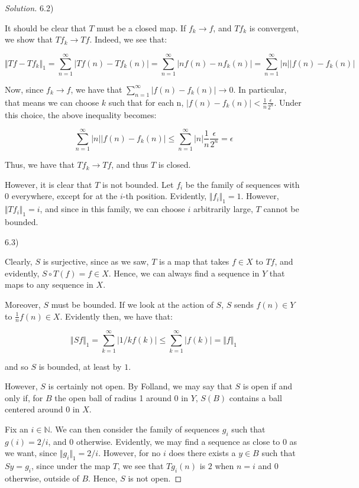 \documentclass[10pt]{article}
\begin{document}
\begin{proof}[Solution]
6.2)

It should be clear that $T$ must be a closed map. If $f_k \to f$, and $T f_k$ is convergent, we show that $Tf_k \to Tf$. Indeed, we see that:

$$ \Vert Tf - Tf_k \Vert_1 = \sum_{n=1}^\infty | Tf(n) - Tf_k(n) | = \sum_{n=1}^\infty |n f(n) - n f_k(n)| = \sum_{n=1}^\infty |n| |f(n)  - f_k(n) | $$

Now, since $f_k \to f$, we have that $\sum_{n=1}^\infty | f(n) - f_k(n) | \to 0$. In particular, that means we can choose $k$ such that for each n, $| f(n) - f_k(n) | < \frac{1}{n} \frac{\epsilon}{2^n}$. Under this choice, the above inequality becomes:

$$ \sum_{n=1}^\infty |n| |f(n)  - f_k(n) | \leq \sum_{n=1}^\infty |n| \frac{1}{n} \frac{\epsilon}{2^n} = \epsilon$$

Thus, we have that $Tf_k \to Tf$, and thus $T$ is closed.

However, it is clear that $T$ is not bounded. Let $f_i$ be the family of sequences with $0$ everywhere, except for at the $i$-th position. Evidently, $\Vert f_i \Vert_1 = 1$. However, $\Vert Tf_i \Vert_1 = i$, and since in this family, we can choose $i$ arbitrarily large, $T$ cannot be bounded.

6.3)

Clearly, $S$ is surjective, since as we saw, $T$ is a map that takes $f \in X$ to $Tf$, and evidently, $S \circ T(f) = f \in X$. Hence, we can always find a sequence in $Y$ that maps to any sequence in $X$.

Moreover, $S$ must be bounded. If we look at the action of $S$, $S$ sends $f(n) \in Y$ to $\frac{1}{n} f(n) \in X$. Evidently then, we have that:

$$ \Vert Sf \Vert_1 = \sum_{k=1}^\infty | 1/k f(k) | \leq \sum_{k=1}^\infty | f(k)| = \Vert f \Vert_1$$

and so $S$ is bounded, at least by $1$.

However, $S$ is certainly not open. By Folland, we may say that $S$ is open if and only if, for $B$ the open ball of radius 1 around 0 in $Y$, $S(B)$ contains a ball centered around $0$ in $X$.

Fix an $i \in \mathbb{N}$. We can then consider the family of sequences $g_i$ such that $g(i) = 2/i$, and 0 otherwise. Evidently, we may find a sequence as close to 0 as we want, since $\Vert g_i \Vert_1 = 2/i$. However, for no $i$ does there exists a $y \in B$ such that $Sy = g_i$, since under the map $T$, we see that $Tg_i(n)$ is $2$ when $n=i$ and $0$ otherwise, outside of $B$. Hence, $S$ is not open.

\end{proof}
\end{document}
